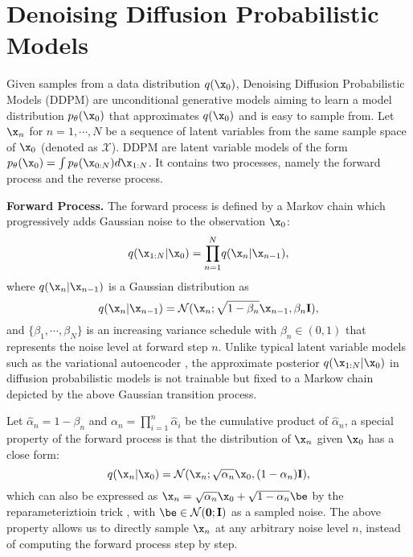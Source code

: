 {\section{Denoising Diffusion Probabilistic Models} \label{sec:ddpm}

\par Given samples from a data distribution $q({\x_0})$, Denoising Diffusion Probabilistic Models (DDPM) \cite{ho2020denoising} are unconditional generative models aiming to learn a model distribution $p_\theta(\x_0)$ that approximates $q({\x_0})$ and is easy to sample from. Let $\x_n$ for $n=1,\cdots, N$ be a sequence of latent variables from the same sample space of $\x_0$ (denoted as $\mathcal X$). DDPM are latent variable models of the form $p_\theta(\x_0)=\int p_\theta(\x_{0:N})d{\x_{1:N}}$. It contains two processes, namely the forward process and the reverse process. 
\par \textbf{Forward Process.} The forward process is defined by a Markov chain which progressively adds Gaussian noise to the observation $\x_0$:
\begin{equation}
    q(\x_{1:N}  | \x_0 ) = {\prod_{n=1}^{N}} q(\x_n | \x_{n-1}),
    \label{eq:forward_process}
\end{equation}
where $q(\x_n | \x_{n-1})$ is a Gaussian distribution as
\begin{equation}
    q(\x_n | \x_{n-1}) = {\mathcal{N}(\x_n;\sqrt{1-\beta_n} \x_{n-1}, \beta_n \mathbf{I} )},
    \label{eq:forward_Gaussian}
\end{equation}
and $\{ \beta_1, \cdots, \beta_N \}$ is an increasing variance schedule  with $\beta_n \in (0,1)$ that represents the noise level at forward step $n$. Unlike typical latent variable models such as the variational autoencoder \cite{rezende2014stochastic}, the approximate posterior $q(\x_{1:N}  | \x_0 )$ in diffusion probabilistic models is not trainable but fixed to a Markow chain depicted by the above Gaussian transition process. 
\par Let ${\hat \alpha}_n = 1 - \beta_n$ and $\alpha_n= \prod_{i=1}^{n} {\hat \alpha}_i$ be the cumulative product of ${\hat \alpha}_n$, a special property of the forward process is that the distribution of $\x_n$ given $\x_0$ has a close form:
\begin{equation}
    q(\x_n|\x_0) = \mathcal{N}(\x_n; \sqrt{\alpha_n}\x_0, (1-\alpha_n){\mathbf{I}}),
    \label{eq:forward_property}
\end{equation}
which can also be expressed as $\x_n = \sqrt{\alpha_n} \x_0 + \sqrt{1 - \alpha_n} {\be}$ by the reparameteriztioin trick \cite{kingma2013auto}, with $\be \in {\mathcal N}(\mathbf{0}; \mathbf{I})$ as a sampled noise. The above property allows us to directly sample $\x_n$ at any arbitrary noise level $n$, instead of computing the forward process step by step.

}
